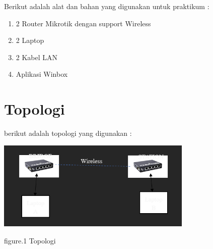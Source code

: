 Berikut adalah alat dan bahan yang digunakan untuk praktikum :

\begin{enumerate}
    \item 2 Router Mikrotik dengan support Wireless
    \item 2 Laptop
    \item 2 Kabel LAN 
    \item Aplikasi Winbox
\end{enumerate}

\section{Topologi}

berikut adalah topologi yang digunakan :

\begin{center}
    \includegraphics[width=0.7\textwidth]{image/P1/Topologi.png}    
    
    figure.1 Topologi
\end{center}

